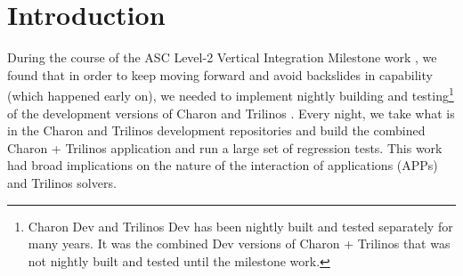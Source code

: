 \documentclass[pdf,ps2pdf,11pt]{SANDreport}
\begin{document}
%
\clearpage
\tableofcontents






%


\SANDmain %


%
\section{Introduction}
%

During the course of the ASC Level-2 Vertical Integration Milestone work
{}\cite{ref:asc-vertical-integration-milestone}, we found that in order to
keep moving forward and avoid backslides in capability (which happened early
on), we needed to implement nightly building and testing\footnote{Charon Dev
and Trilinos Dev has been nightly built and tested separately for many years.
It was the combined Dev versions of Charon + Trilinos that was not nightly
built and tested until the milestone work.} of the development versions of
Charon and Trilinos {}\cite{ref:trilinos}.  Every night, we take what is in
the Charon and Trilinos development repositories and build the combined Charon
+ Trilinos application and run a large set of regression tests.  This work had
broad implications on the nature of the interaction of applications (APPs) and
Trilinos solvers.
\end{document}
